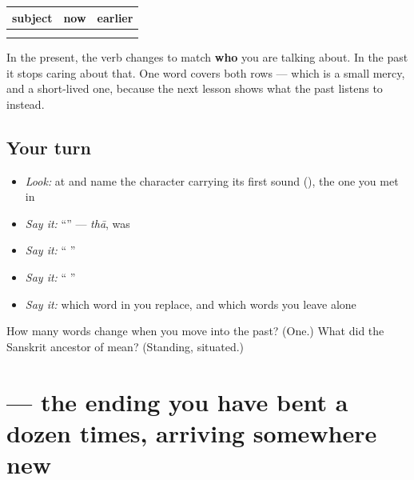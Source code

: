 \begin{grammarlens}[title={Grammar Lens: two present words, one past word}]
\noindent
\begin{tabularx}{\linewidth}{@{}>{\raggedright\arraybackslash}X>{\raggedright\arraybackslash}X>{\raggedright\arraybackslash}X@{}}
\toprule
\textbf{subject} & \textbf{now} & \textbf{earlier} \\
\midrule
\hi{मैं} & \hi{हूँ} & \hi{था} \\
\hi{वह} & \hi{है} & \hi{था} \\
\bottomrule
\end{tabularx}

In the present, the verb changes to match \textbf{who} you are talking about. In the past it stops caring about that. One word covers both rows — which is a small mercy, and a short-lived one, because the next lesson shows what the past listens to instead.
\end{grammarlens}

\subsection*{Your turn}
\begin{itemize}
\raggedright
  \item \emph{Look:} at \textbf{} and name the character carrying its first sound (\textbf{}), the one you met in \textbf{}
  \item \emph{Say it:} \textquotedblleft{}\textquotedblright{} — \emph{thā}, was
  \item \emph{Say it:} \textquotedblleft{}   \textquotedblright{}
  \item \emph{Say it:} \textquotedblleft{}   \textquotedblright{}
  \item \emph{Say it:} which word in \emph{   } you replace, and which words you leave alone
\end{itemize}

\begin{tcolorbox}[breakable,colback=teal!4,colframe=teal!35!black,title={Before you move on}]
How many words change when you move \emph{   } into the past? (One.) What did the Sanskrit ancestor of  mean? (Standing, situated.)
\end{tcolorbox}
\section[\texorpdfstring{\hi{थी} (thī)}{थी (thī)}]{ — the ending you have bent a dozen times, arriving somewhere new}

